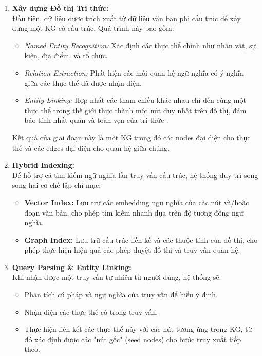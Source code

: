 \begin{enumerate}
    \item \textbf{Xây dựng Đồ thị Tri thức:} \\
    Đầu tiên, dữ liệu được trích xuất từ dữ liệu văn bản phi cấu trúc để xây dựng một KG có cấu trúc. Quá trình này bao gồm:
    \begin{itemize}
        \item \textit{Named Entity Recognition:} Xác định các thực thể chính như nhân vật, sự kiện, địa điểm, và tổ chức.
        \item \textit{Relation Extraction:} Phát hiện các mối quan hệ ngữ nghĩa có ý nghĩa giữa các thực thể đã được nhận diện.
        \item \textit{Entity Linking:} Hợp nhất các tham chiếu khác nhau chỉ đến cùng một thực thể trong thế giới thực thành một nút duy nhất trên đồ thị, đảm bảo tính nhất quán và toàn vẹn của tri thức \cite{han2024retrieval}.
    \end{itemize}
    Kết quả của giai đoạn này là một KG trong đó các nodes đại diện cho thực thể và các edges đại diện cho quan hệ giữa chúng.

    \item \textbf{Hybrid Indexing:} \\
    Để hỗ trợ cả tìm kiếm ngữ nghĩa lẫn truy vấn cấu trúc, hệ thống duy trì song song hai cơ chế lập chỉ mục:
    \begin{itemize}
        \item \textbf{Vector Index:} Lưu trữ các embedding ngữ nghĩa của các nút và/hoặc đoạn văn bản, cho phép tìm kiếm nhanh dựa trên độ tương đồng ngữ nghĩa.
        \item \textbf{Graph Index:} Lưu trữ cấu trúc liền kề và các thuộc tính của đồ thị, cho phép thực hiện hiệu quả các phép duyệt đồ thị và truy vấn quan hệ.
    \end{itemize}

    \item \textbf{Query Parsing \& Entity Linking:} \\
    Khi nhận được một truy vấn tự nhiên từ người dùng, hệ thống sẽ:
    \begin{itemize}
        \item Phân tích cú pháp và ngữ nghĩa của truy vấn để hiểu ý định.
        \item Nhận diện các thực thể có trong truy vấn.
        \item Thực hiện liên kết các thực thể này với các nút tương ứng trong KG, từ đó xác định được các "nút gốc" (seed nodes) cho bước truy xuất tiếp theo.
    \end{itemize}


\end{enumerate}
